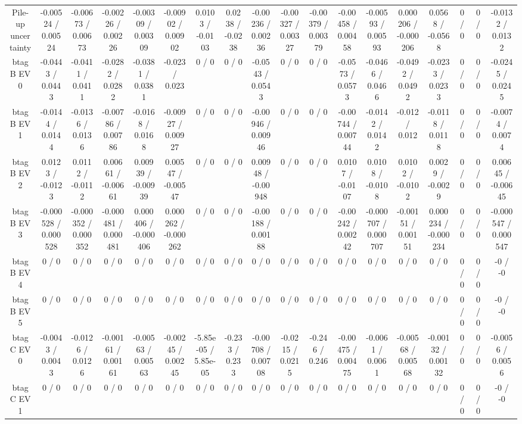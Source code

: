 \documentclass[10pt]{article}
\begin{document}
\begin{table}[htbp]
\begin{center}
\begin{tabular}{|c|c|c|c|c|c|c|c|c|c|c|c|c|c|c|c|c|c|}
  Pile-up uncertainty & -0.00524 / 0.00524 & -0.00673 / 0.00673 & -0.00226 / 0.00226 & -0.00309 / 0.00309 & -0.00902 / 0.00902 & 0.0103 / -0.0103 & 0.0238 / -0.0238 & -0.00236 / 0.00236 & -0.00327 / 0.00327 & -0.00379 / 0.00379 & -0.00458 / 0.00458 & -0.00593 / 0.00593 & 0.000206 / -0.000206 & 0.0568 / -0.0568 & 0 / 0 & 0 / 0 & -0.0132 / 0.0132 \\ 
  btag B EV 0 & -0.0443 / 0.0443 & -0.0411 / 0.0411 & -0.0282 / 0.0282 & -0.0381 / 0.0381 & -0.023 / 0.023 & 0 / 0 & 0 / 0 & -0.0543 / 0.0543 & 0 / 0 & 0 / 0 & -0.0573 / 0.0573 & -0.0466 / 0.0466 & -0.0492 / 0.0492 & -0.0233 / 0.0233 & 0 / 0 & 0 / 0 & -0.0245 / 0.0245 \\ 
  btag B EV 1 & -0.0144 / 0.0144 & -0.0136 / 0.0136 & -0.00786 / 0.00786 & -0.0168 / 0.0168 & -0.00927 / 0.00927 & 0 / 0 & 0 / 0 & -0.00946 / 0.00946 & 0 / 0 & 0 / 0 & -0.00744 / 0.00744 & -0.0142 / 0.0142 & -0.012 / 0.012 & -0.0118 / 0.0118 & 0 / 0 & 0 / 0 & -0.0074 / 0.0074 \\ 
  btag B EV 2 & 0.0123 / -0.0123 & 0.0112 / -0.0112 & 0.00661 / -0.00661 & 0.00939 / -0.00939 & 0.00547 / -0.00547 & 0 / 0 & 0 / 0 & 0.00948 / -0.00948 & 0 / 0 & 0 / 0 & 0.0107 / -0.0107 & 0.0108 / -0.0108 & 0.0102 / -0.0102 & 0.0029 / -0.0029 & 0 / 0 & 0 / 0 & 0.00645 / -0.00645 \\ 
  btag B EV 3 & -0.000528 / 0.000528 & -0.000352 / 0.000352 & -0.000481 / 0.000481 & 0.000406 / -0.000406 & 0.000262 / -0.000262 & 0 / 0 & 0 / 0 & -0.00188 / 0.00188 & 0 / 0 & 0 / 0 & -0.00242 / 0.00242 & -0.000707 / 0.000707 & -0.00151 / 0.00151 & 0.000234 / -0.000234 & 0 / 0 & 0 / 0 & -0.000547 / 0.000547 \\ 
  btag B EV 4 & 0 / 0 & 0 / 0 & 0 / 0 & 0 / 0 & 0 / 0 & 0 / 0 & 0 / 0 & 0 / 0 & 0 / 0 & 0 / 0 & 0 / 0 & 0 / 0 & 0 / 0 & 0 / 0 & 0 / 0 & 0 / 0 & -0 / -0 \\ 
  btag B EV 5 & 0 / 0 & 0 / 0 & 0 / 0 & 0 / 0 & 0 / 0 & 0 / 0 & 0 / 0 & 0 / 0 & 0 / 0 & 0 / 0 & 0 / 0 & 0 / 0 & 0 / 0 & 0 / 0 & 0 / 0 & 0 / 0 & -0 / -0 \\ 
  btag C EV 0 & -0.0043 / 0.0043 & -0.0126 / 0.0126 & -0.00161 / 0.00161 & -0.00563 / 0.00563 & -0.00245 / 0.00245 & -5.85e-05 / 5.85e-05 & -0.233 / 0.233 & -0.00708 / 0.00708 & -0.0215 / 0.0215 & -0.246 / 0.246 & -0.00475 / 0.00475 & -0.0061 / 0.0061 & -0.00568 / 0.00568 & -0.00132 / 0.00132 & 0 / 0 & 0 / 0 & -0.0056 / 0.0056 \\ 
  btag C EV 1 & 0 / 0 & 0 / 0 & 0 / 0 & 0 / 0 & 0 / 0 & 0 / 0 & 0 / 0 & 0 / 0 & 0 / 0 & 0 / 0 & 0 / 0 & 0 / 0 & 0 / 0 & 0 / 0 & 0 / 0 & 0 / 0 & -0 / -0 \\ 

\end{tabular}
\end{center}
\end{table}
\end{document}
